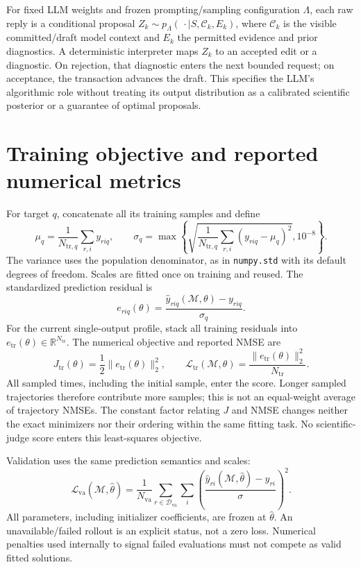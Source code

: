 \documentclass[11pt]{article}
\newcommand{\R}{\mathbb{R}}
\newcommand{\Dva}{\mathcal{D}_{\mathrm{va}}}
\newcommand{\M}{\mathcal{M}}
\newcommand{\Loss}{\mathcal{L}}
\begin{document}
For fixed LLM weights and frozen prompting/sampling configuration $\Lambda$,
each raw reply is a conditional proposal
$Z_k\sim p_\Lambda(\,\cdot\mid S,\mathcal C_k,E_k)$, where $\mathcal C_k$ is
the visible committed/draft model context and $E_k$ the permitted evidence and
prior diagnostics. A deterministic interpreter maps $Z_k$ to an accepted edit
or a diagnostic. On rejection, that diagnostic enters the next bounded request;
on acceptance, the transaction advances the draft. This specifies the LLM's
algorithmic role without treating its output distribution as a calibrated
scientific posterior or a guarantee of optimal proposals.

\section{Training objective and reported numerical metrics}
\label{sec:objective}

For target $q$, concatenate all its training samples and define
\begin{equation}
 \mu_q=\frac1{N_{\mathrm{tr},q}}\sum_{r,i}y_{riq},\qquad
 \sigma_q=\max\left\{
 \sqrt{\frac1{N_{\mathrm{tr},q}}\sum_{r,i}(y_{riq}-\mu_q)^2},10^{-8}\right\}.
\end{equation}
The variance uses the population denominator, as in \texttt{numpy.std} with its
default degrees of freedom. Scales are fitted once on training and reused.
The standardized prediction residual is
\begin{equation}
 e_{riq}(\theta)=\frac{\widehat y_{riq}(\M,\theta)-y_{riq}}{\sigma_q}.
 \label{eq:residual}
\end{equation}
For the current single-output profile, stack all training residuals into
$e_{\mathrm{tr}}(\theta)\in\R^{N_{\mathrm{tr}}}$. The numerical objective and
reported NMSE are
\begin{equation}
 J_{\mathrm{tr}}(\theta)=\frac12\|e_{\mathrm{tr}}(\theta)\|_2^2,
 \qquad
 \Loss_{\mathrm{tr}}(\M,\theta)=\frac{\|e_{\mathrm{tr}}(\theta)\|_2^2}
 {N_{\mathrm{tr}}}.
 \label{eq:objective}
\end{equation}
All sampled times, including the initial sample, enter the score. Longer sampled
trajectories therefore contribute more samples; this is not an equal-weight
average of trajectory NMSEs. The constant factor relating $J$ and NMSE changes
neither the exact minimizers nor their ordering within the same fitting task.
No scientific-judge score enters this least-squares objective.

Validation uses the same prediction semantics and scales:
\begin{equation}
 \Loss_{\mathrm{va}}(\M,\widehat\theta)
 =\frac1{N_{\mathrm{va}}}\sum_{r\in\Dva}\sum_i
 \left(\frac{\widehat y_{ri}(\M,\widehat\theta)-y_{ri}}{\sigma}\right)^2.
 \label{eq:val}
\end{equation}
All parameters, including initializer coefficients, are frozen at
$\widehat\theta$. An unavailable/failed rollout is an explicit status, not a
zero loss. Numerical penalties used internally to signal failed evaluations
must not compete as valid fitted solutions.
\end{document}
